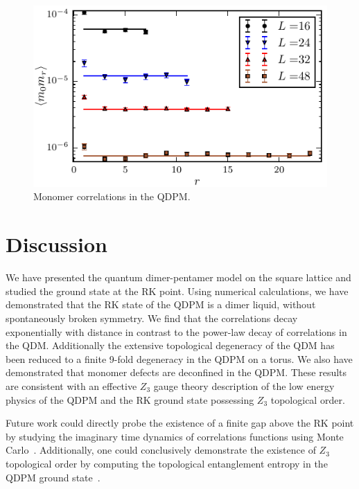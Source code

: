 \documentclass[twocolumn,prb,aps,floatfix,superscriptaddress]{revtex4-1}
\begin{document}
    \begin{figure}[]
        \centering
        \includegraphics[width=1.0\columnwidth]{monomer_cor_log.pdf}
        \caption{Monomer correlations in the QDPM.}
        \label{fig:vis_dmr_cut}
    \end{figure}

\section{Discussion}

We have presented the quantum dimer-pentamer model on the square lattice and studied the ground state at the RK point. Using numerical calculations, we have demonstrated that the RK state of the QDPM is a dimer liquid, without spontaneously broken symmetry. We find that the correlations decay exponentially with distance in contrast to the power-law decay of correlations in the QDM. Additionally the extensive topological degeneracy of the QDM has been reduced to a finite 9-fold degeneracy in the QDPM on a torus. We also have demonstrated that monomer defects are deconfined in the QDPM. These results are consistent with an effective $Z_3$ gauge theory description of the low energy physics of the QDPM and the RK ground state possessing $Z_3$ topological order.

Future work could directly probe the existence of a finite gap above the RK point by studying the imaginary time dynamics of correlations functions using Monte Carlo~\cite{Henley}. Additionally, one could conclusively demonstrate the existence of $Z_3$ topological order by computing the topological entanglement entropy in the QDPM ground state~\cite{Levin2005,Kitaev2005,Hastings2010}.
\end{document}
